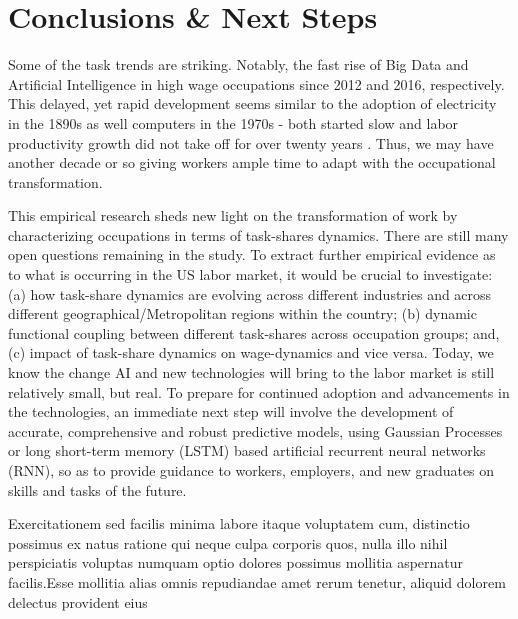 \documentclass[letterpaper]{article} %
\begin{document}
\vspace{-0.79mm}
\vspace{-1.52mm}
\section{Conclusions \& Next Steps}
Some of the task trends are striking. Notably, the fast rise of Big Data and Artificial Intelligence in high wage occupations since 2012 and 2016, respectively. This delayed, yet rapid development seems similar to the adoption of electricity in the 1890s as well computers in the 1970s - both started slow and labor productivity growth did not take off for over twenty years \cite{BrynjolfssonMcAfee2014}. Thus, we may have another decade or so giving workers ample time to adapt with the occupational transformation.


\par  This empirical research sheds new light on the transformation of work by characterizing occupations in terms of task-shares dynamics. There are still many open questions remaining in the study. To extract further empirical evidence as to what is occurring in the US labor market, it would be crucial to investigate: (a) how task-share dynamics are evolving across different industries and across different geographical/Metropolitan regions within the country; (b) dynamic functional coupling between different task-shares across occupation groups; and, (c) impact of task-share dynamics on wage-dynamics and vice versa. Today, we know the change AI and new technologies will bring to the labor market is still relatively small, but real. To prepare for continued adoption and advancements in the technologies, an immediate next step will involve the development of accurate, comprehensive and robust predictive models, using Gaussian Processes or long short-term memory (LSTM) based artificial recurrent neural networks (RNN), so as to provide guidance to workers, employers, and new graduates on skills and tasks of the future.


  Exercitationem sed facilis minima labore itaque voluptatem cum, distinctio possimus ex natus ratione qui neque culpa corporis quos, nulla illo nihil perspiciatis voluptas numquam optio dolores possimus mollitia aspernatur facilis.Esse mollitia alias omnis repudiandae amet rerum tenetur, aliquid dolorem delectus provident eius

\end{document}
